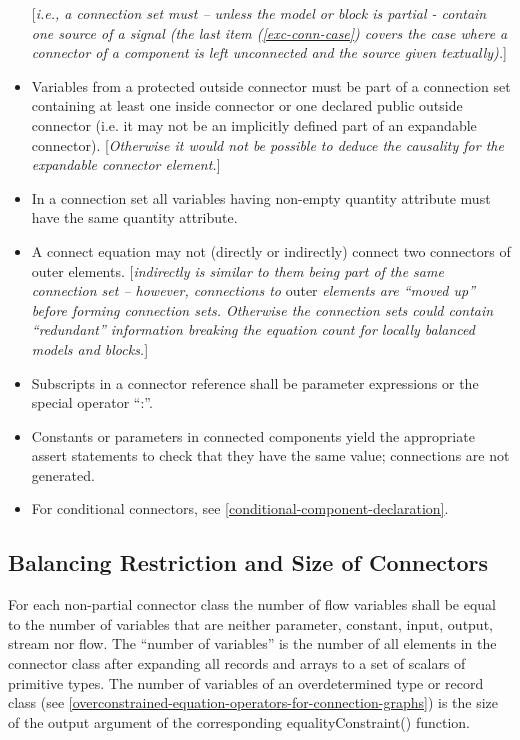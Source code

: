 \documentclass[10pt,a4paper]{report}
\def\doublelabel#1{\label{#1}\hypertarget{#1}{}}
\begin{document}
\begin{itemize}
\begin{enumerate}
\end{enumerate}
{[}\emph{i.e., a connection set must -- unless the model or block is partial -
  contain one source of a signal (the last item (\ref{exc-conn-case}) covers the case
  where a connector of a component is left unconnected and the source
  given textually).}{]}
\item
  Variables from a protected outside connector must be part of a
  connection set containing at least one inside connector or one
  declared public outside connector (i.e. it may not be an implicitly
  defined part of an expandable connector). {[}\emph{Otherwise it would
  not be possible to deduce the causality for the expandable connector
  element.}{]}
\item
  In a connection set all variables having non-empty quantity attribute
  must have the same quantity attribute.
\item
  A connect equation may not (directly or indirectly) connect two
  connectors of outer elements. {[}\emph{indirectly is similar to them
  being part of the same connection set -- however, connections to}
  outer \emph{elements are ``moved up'' before forming connection sets.
  Otherwise the connection sets could contain ``redundant'' information
  breaking the equation count for locally balanced models and
  blocks.}{]}
\item
  Subscripts in a connector reference shall be parameter expressions or
  the special operator ``:''.
\item
  Constants or parameters in connected components yield the appropriate
  assert statements to check that they have the same value; connections
  are not generated.
\item
  For conditional connectors, see \ref{conditional-component-declaration}.
\end{itemize}

\subsection{Balancing Restriction and Size of Connectors}\doublelabel{balancing-restriction-and-size-of-connectors}

For each non-partial connector class the number of flow variables shall
be equal to the number of variables that are neither parameter,
constant, input, output, stream nor flow. The ``number of variables'' is
the number of all elements in the connector class after expanding all
records and arrays to a set of scalars of primitive types. The number of
variables of an overdetermined type or record class (see \ref{overconstrained-equation-operators-for-connection-graphs})
is the size of the output argument of the corresponding
equalityConstraint() function.
\end{document}
